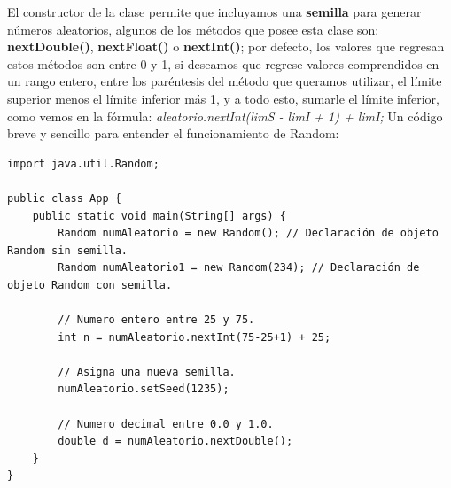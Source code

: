 El constructor de la clase permite que incluyamos una \textbf{semilla} para generar números aleatorios, algunos de los métodos que posee esta clase son: \textbf{nextDouble()}, \textbf{nextFloat()} o \textbf{nextInt()}; por defecto, los valores que regresan estos métodos son entre 0 y 1, si deseamos que regrese valores comprendidos en un rango entero, entre los paréntesis del método que queramos utilizar, el límite superior menos el límite inferior más 1, y a todo esto, sumarle el límite inferior, como vemos en la fórmula: \textit{aleatorio.nextInt(limS - limI + 1) + limI;}
Un código breve y sencillo para entender el funcionamiento de Random:
\begin{lstlisting}
import java.util.Random;

public class App {
	public static void main(String[] args) {
		Random numAleatorio = new Random(); // Declaración de objeto Random sin semilla.
		Random numAleatorio1 = new Random(234); // Declaración de objeto Random con semilla.

		// Numero entero entre 25 y 75.
		int n = numAleatorio.nextInt(75-25+1) + 25;

		// Asigna una nueva semilla.
		numAleatorio.setSeed(1235);

		// Numero decimal entre 0.0 y 1.0.
		double d = numAleatorio.nextDouble();
	}
}
\end{lstlisting}


